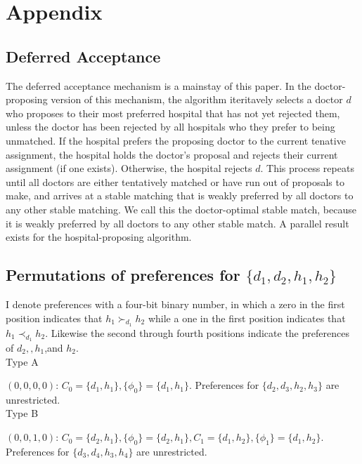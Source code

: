 \documentclass[WP]{AEA}
\begin{document}



\appendix



\section{ Appendix}

\subsection{Deferred Acceptance}
The deferred acceptance mechanism is a mainstay of this paper. In the doctor-proposing version of this mechanism, the algorithm iteritavely selects a doctor $d$ who proposes to their most preferred hospital that has not yet rejected them, unless the doctor has been rejected by all hospitals who they prefer to being unmatched.  If the hospital prefers the proposing doctor to the current tenative assignment, the hospital holds the doctor's proposal and rejects their current assignment (if one exists). Otherwise, the hospital rejects $d$.  This process repeats until all doctors are either tentatively matched or have run out of proposals to make, and arrives at a stable matching that is weakly preferred by all doctors to any other stable matching.  We call this the doctor-optimal stable match, because it is weakly preferred by all doctors to any other stable match.  A parallel result exists for the hospital-proposing algorithm.


\subsection{Permutations of preferences for $\{d_1,d_2,h_1,h_2\}$}
I denote preferences with a four-bit binary number, in which a zero in the first position indicates that $h_1\succ_{d_1} h_2$ while a one in the first position indicates that $h_1\prec_{d_1} h_2$. Likewise the second through fourth positions indicate the preferences of $d_2, ,h_1$,and $h_2$.
\\
Type A

$(0,0,0,0)$: $C_0 =\{d_1,h_1\}, \{\phi_0\}=\{d_1,h_1\}$.  Preferences for $\{d_2,d_3,h_2,h_3\}$ are unrestricted.
\\

Type B

$(0,0,1,0)$: $C_0 =\{d_2,h_1\}, \{\phi_0\}=\{d_2,h_1\}, C_1 =\{d_1,h_2\}, \{\phi_1\}=\{d_1,h_2\}$.  Preferences for $\{d_3,d_4,h_3,h_4\}$ are unrestricted.
\end{document}
